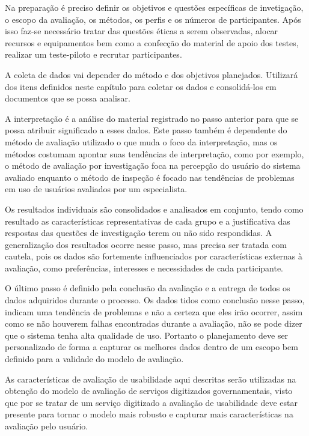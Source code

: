 Na preparação é preciso definir os objetivos e questões específicas de invetigação, o escopo da avaliação, os métodos, os perfis e os números de participantes. Após isso faz-se necessário tratar das questões éticas a serem observadas, alocar recursos e equipamentos bem como a confecção do material de apoio dos testes, realizar um teste-piloto e recrutar participantes.

A coleta de dados vai depender do método e dos objetivos planejados. Utilizará dos itens definidos neste capítulo para coletar os dados e consolidá-los em documentos que se possa analisar.

A interpretação é a análise do material registrado no passo anterior para que se possa atribuir significado a esses dados. Este passo também é dependente do método de avaliação utilizado o que muda o foco da interpretação, mas os métodos costumam apontar suas tendências de interpretação, como por exemplo, o método de avaliação por investigação foca na percepção do usuário do sistema avaliado enquanto o método de inspeção é focado nas tendências de problemas em uso de usuários avaliados por um especialista.

Os resultados individuais são consolidados e analisados em conjunto, tendo como resultado as características representativas de cada grupo e a justificativa das respostas das questões de investigação terem ou não sido respondidas. A generalização dos resultados ocorre nesse passo, mas precisa ser tratada com cautela, pois os dados são fortemente influenciados por características externas à avaliação, como preferências, interesses e necessidades de cada participante.

O último passo é definido pela conclusão da avaliação e a entrega de todos os dados adquiridos durante o processo. Os dados tidos como conclusão nesse passo, indicam uma tendência de problemas e não a certeza que eles irão ocorrer, assim como se não houverem falhas encontradas durante a avaliação, não se pode dizer que o sistema tenha alta qualidade de uso. Portanto o planejamento deve ser personalizado de forma a capturar os melhores dados dentro de um escopo bem definido para a validade do modelo de avaliação.

As características de avaliação de usabilidade aqui descritas serão utilizadas na obtenção do modelo de avaliação de serviços digitizados governamentais, visto que por se tratar de um serviço digitizado a avaliação de usabilidade deve estar presente para tornar o modelo mais robusto e capturar mais características na avaliação pelo usuário.
